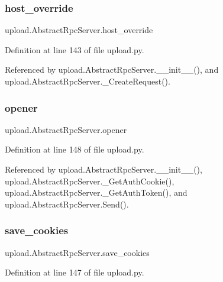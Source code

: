 \subsubsection{\texorpdfstring{host\+\_\+override}{host\_override}}
{\footnotesize\ttfamily upload.\+Abstract\+Rpc\+Server.\+host\+\_\+override}



Definition at line 143 of file upload.\+py.



Referenced by upload.\+Abstract\+Rpc\+Server.\+\_\+\+\_\+init\+\_\+\+\_\+(), and upload.\+Abstract\+Rpc\+Server.\+\_\+\+Create\+Request().

\mbox{\label{classupload_1_1AbstractRpcServer_aa931446476e0e86f3ade7fef0a0aea5a}} 
\subsubsection{\texorpdfstring{opener}{opener}}
{\footnotesize\ttfamily upload.\+Abstract\+Rpc\+Server.\+opener}



Definition at line 148 of file upload.\+py.



Referenced by upload.\+Abstract\+Rpc\+Server.\+\_\+\+\_\+init\+\_\+\+\_\+(), upload.\+Abstract\+Rpc\+Server.\+\_\+\+Get\+Auth\+Cookie(), upload.\+Abstract\+Rpc\+Server.\+\_\+\+Get\+Auth\+Token(), and upload.\+Abstract\+Rpc\+Server.\+Send().

\mbox{\label{classupload_1_1AbstractRpcServer_affe342205c4647d41b127f5a5634858b}} 
\subsubsection{\texorpdfstring{save\+\_\+cookies}{save\_cookies}}
{\footnotesize\ttfamily upload.\+Abstract\+Rpc\+Server.\+save\+\_\+cookies}



Definition at line 147 of file upload.\+py.



